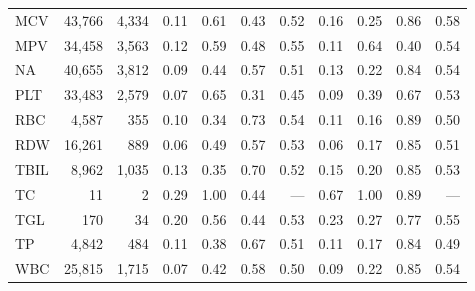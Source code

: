 \begin{table}[ht]
\begin{tabular}{lrrrrrrrrrr}
MCV & 43,766 & 4,334 & 0.11 & 0.61 & 0.43 & 0.52 & 0.16 & 0.25 & 0.86 & 0.58 \\
MPV & 34,458 & 3,563 & 0.12 & 0.59 & 0.48 & 0.55 & 0.11 & 0.64 & 0.40 & 0.54 \\
NA & 40,655 & 3,812 & 0.09 & 0.44 & 0.57 & 0.51 & 0.13 & 0.22 & 0.84 & 0.54 \\
PLT & 33,483 & 2,579 & 0.07 & 0.65 & 0.31 & 0.45 & 0.09 & 0.39 & 0.67 & 0.53 \\
RBC & 4,587 & 355 & 0.10 & 0.34 & 0.73 & 0.54 & 0.11 & 0.16 & 0.89 & 0.50 \\
RDW & 16,261 & 889 & 0.06 & 0.49 & 0.57 & 0.53 & 0.06 & 0.17 & 0.85 & 0.51 \\
TBIL & 8,962 & 1,035 & 0.13 & 0.35 & 0.70 & 0.52 & 0.15 & 0.20 & 0.85 & 0.53 \\
TC & 11 & 2 & 0.29 & 1.00 & 0.44 & --- & 0.67 & 1.00 & 0.89 & --- \\
TGL & 170 & 34 & 0.20 & 0.56 & 0.44 & 0.53 & 0.23 & 0.27 & 0.77 & 0.55 \\
TP & 4,842 & 484 & 0.11 & 0.38 & 0.67 & 0.51 & 0.11 & 0.17 & 0.84 & 0.49 \\
WBC & 25,815 & 1,715 & 0.07 & 0.42 & 0.58 & 0.50 & 0.09 & 0.22 & 0.85 & 0.54 \\
\bottomrule
\end{tabular}
\label{tab:12_eval_detail_eicu_mortality}
\end{table}